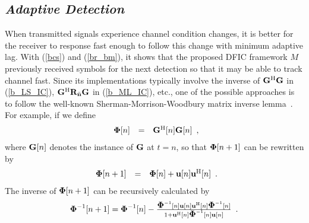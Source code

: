 \documentclass[a4paper,10pt,fleqn, twocolumn]{IEEETran}
\newcommand{\bG}{{\bf G}}
\newcommand{\bn}{{\bf n}}
\newcommand{\bu}{{\bf u}}
\newcommand{\bR}{{\bf R}}
\newcommand{\bPhi}{{\mbox {\boldmath $\Phi$}}}
\begin{document}
\subsection{\em Adaptive Detection}
When transmitted signals experience channel condition changes, it
is better for the receiver to response fast enough to follow this
change with minimum adaptive lag. With (\ref{bcs}) and
(\ref{br_bm}), it shows that the proposed DFIC framework $M$
previously received symbols for the next detection so that it may
be able to track channel fast. Since its implementations typically
involve the inverse of $\bG^{\rm H}\bG$ in (\ref{b_LS_IC}),
$\bG^{\rm H}\bR_{\bar\bn}\bG$ in (\ref{b_ML_IC}), etc., one of the
possible approaches is to follow the well-known
Sherman-Morrison-Woodbury matrix inverse
lemma~\cite{Haykin96,Wang05B}. For example, if we define
\begin{equation}
\begin{array}{rcl}
\bPhi[n]&=&\bG^{\rm H}[n]\bG[n]
\end{array},\label{R_G}
\end{equation}
\noindent where $\bG[n]$ denotes the instance of $\bG$ at $t=n$,
so that $\bPhi[n+1]$ can be rewritten by
\begin{equation}
\begin{array}{rcl}
\bPhi[n+1]&=&\bPhi[n] + \bu[n]\bu^{\rm H}[n]
\end{array}.
\end{equation}
The inverse of $\bPhi[n+1]$ can be recursively calculated by
\begin{equation}\hspace{-0.08in}
\begin{array}{l}
\bPhi^{-1}[n+1]=\bPhi^{-1}[n]-\frac{\bPhi^{-1}[n]\bu[n]\bu^{\rm
H}[n]\bPhi^{-1}[n]}{1+\bu^{\rm H}[n]\bPhi^{-1}[n]\bu[n]}
\end{array}.\label{adaptiveLS}
\end{equation}
\end{document}
